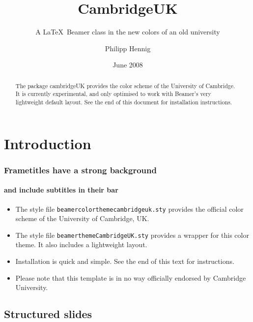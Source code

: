 \documentclass{beamer}
\title{CambridgeUK}
\subtitle{A \LaTeX~Beamer class in the new colors of an old university}
\author{Philipp Hennig}
\date{June 2008}
\begin{document}
\begin{frame}
\titlepage
\end{frame}

\begin{frame}

\begin{abstract}
The package cambridgeUK provides the color scheme of the University of Cambridge. It is currently experimental, and only optimised to work with Beamer's very lightweight default layout. See the end of this document for installation instructions.
\end{abstract}

\end{frame}

\section{Introduction}

\begin{frame}
\frametitle{Frametitles have a strong background}
\framesubtitle{and include subtitles in their bar}

\begin{itemize}
	\item The style file {\tt beamercolorthemecambridgeuk.sty} provides the official color scheme of the \alert{University of Cambridge, UK}. \cite{UCGuide}
	\item The style file {\tt beamerthemeCambridgeUK.sty} provides a \alert{wrapper} for this color theme. It also includes a lightweight layout.
	\item \alert{Installation} is quick and simple. See the end of this text for instructions.
	\item Please note that this template is \alert{in no way officially endorsed} by Cambridge University. 
\end{itemize}
\end{frame}

\subsection{Structured slides}
\end{document}
